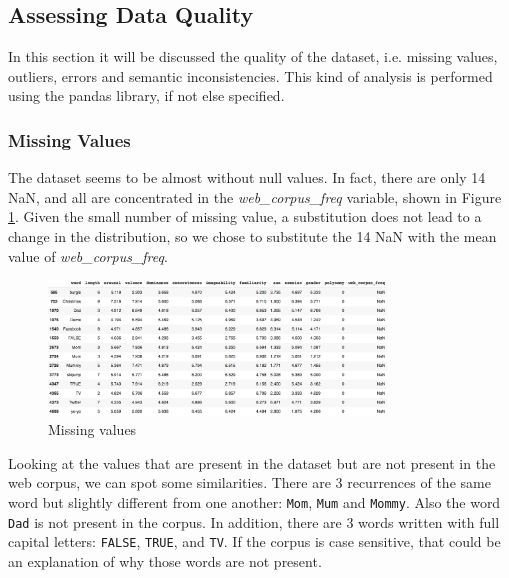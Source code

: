 \documentclass[a4paper,11pt,dvipsnames]{article}
\begin{document}








\subsection{Assessing Data Quality}
In this section it will be discussed the quality of the dataset, i.e. missing values, outliers, errors and semantic inconsistencies. This kind of analysis is performed using the pandas library, if not else specified.

\subsubsection{Missing Values}

The dataset seems to be almost without null values. In fact, there are only 14 NaN, and all are concentrated in the \textit{web\_corpus\_freq} variable, shown in Figure \ref{fig:missing}. Given the small number of missing value, a substitution does not lead to a change in the distribution, so we chose to substitute the 14 NaN with the mean value of \textit{web\_corpus\_freq}.

\begin{figure}[h]
    \centering
    \includegraphics[width=0.8\textwidth]{Graphs/NaN.png}
    \caption{Missing values}
    \label{fig:missing}
\end{figure}
Looking at the values that are present in the dataset but are not present in the web corpus, we can spot some similarities. There are 3 recurrences of the same word but slightly different from one another: \texttt{Mom}, \texttt{Mum} and \texttt{Mommy}. Also the word \texttt{Dad} is not present in the corpus. In addition, there are 3 words written with full capital letters: \texttt{FALSE}, \texttt{TRUE}, and \texttt{TV}. If the corpus is case sensitive, that could be an explanation of why those words are not present.
\end{document}

